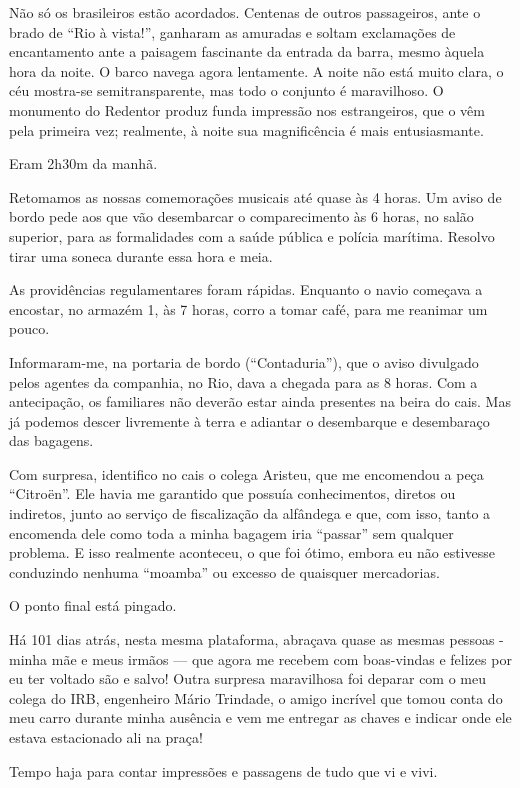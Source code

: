 Não só os brasileiros estão acordados. Centenas de outros passageiros, ante o brado de ``Rio à vista!'', ganharam as amuradas e soltam exclamações de encantamento ante a paisagem fascinante da entrada da barra, mesmo àquela hora da noite. O barco navega agora lentamente. A noite não está muito clara, o céu mostra-se semitransparente, mas todo o conjunto é maravilhoso. O monumento do Redentor produz funda impressão nos estrangeiros, que o vêm pela primeira vez; realmente, à noite sua magnificência é mais entusiasmante.

Eram 2h30m da manhã.

Retomamos as nossas comemorações musicais até quase às 4 horas. Um aviso de bordo pede aos que vão desembarcar o comparecimento às 6 horas, no salão superior, para as formalidades com a saúde pública e polícia marítima. Resolvo tirar uma soneca durante essa hora e meia.

As providências regulamentares foram rápidas. Enquanto o navio começava a encostar, no armazém 1, às 7 horas, corro a tomar café, para me reanimar um pouco.

Informaram-me, na portaria de bordo (``Contaduria''), que o aviso divulgado pelos agentes da companhia, no Rio, dava a chegada para as 8 horas. Com a antecipação, os familiares não deverão estar ainda presentes na beira do cais. Mas já podemos descer livremente à terra e adiantar o desembarque e desembaraço das bagagens.

Com surpresa, identifico no cais o colega Aristeu, que me encomendou a peça ``Citroën''. Ele havia me garantido que possuía conhecimentos, diretos ou indiretos, junto ao serviço de fiscalização da alfândega e que, com isso, tanto a encomenda dele como toda a minha bagagem iria ``passar'' sem qualquer problema. E isso realmente aconteceu, o que foi ótimo, embora eu não estivesse conduzindo nenhuma ``moamba'' ou excesso de quaisquer mercadorias.

O ponto final está pingado.

Há 101 dias atrás, nesta mesma plataforma, abraçava quase as mesmas pessoas - minha mãe e meus irmãos --- que agora me recebem com boas-vindas e felizes por eu ter voltado são e salvo! Outra surpresa maravilhosa foi deparar com o meu colega do IRB, engenheiro Mário Trindade, o amigo incrível que tomou conta do meu carro durante minha ausência e vem me entregar as chaves e indicar onde ele estava estacionado ali na praça!

Tempo haja para contar impressões e passagens de tudo que vi e vivi.

